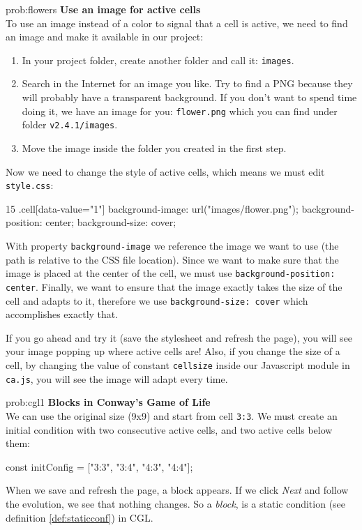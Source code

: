\begin{sol}{prob:flowers}
\textbf{Use an image for active cells}\\
To use an image instead of a color to signal that a cell is active, we need to find an image and
make it available in our project:
\begin{enumerate}
  \item In your project folder, create another folder and call it: \texttt{images}.
  \item Search in the Internet for an image you like. Try to find a PNG because they will probably have
    a transparent background. If you don't want to spend time doing it, we have an image for you:
    \texttt{flower.png} which you can find under folder \texttt{v2.4.1/images}.
  \item Move the image inside the folder you created in the first step.
\end{enumerate}
Now we need to change the style
of active cells, which means we must edit \texttt{style.css}:
\begin{codeh1}{1}{5}
.cell[data-value="1"] {
  background-image: url("images/flower.png");
  background-position: center;
  background-size: cover;
}
\end{codeh1}
With property \texttt{background-image} we reference the image we want to use (the path is relative to the
CSS file location). Since we want to make sure that the image is placed at the center of the cell, we must use
\texttt{background-position: center}. Finally, we want to ensure that the image exactly takes the size of the
cell and adapts to it, therefore we use \texttt{background-size: cover} which accomplishes exactly that.

If you go ahead and try it (save the stylesheet and refresh the page),
you will see your image popping up where active cells are! Also, if you change the size of a cell,
by changing the value of constant \texttt{cellsize} inside our Javascript module in \texttt{ca.js},
you will see the image will adapt every time.
\end{sol}

\begin{sol}{prob:cgl1}
\textbf{Blocks in Conway's Game of Life}\\
We can use the original size (9x9) and start from cell \texttt{3:3}. We must create
an initial condition with two consecutive active cells, and two active cells below them:
\begin{code}
const initConfig = ["3:3", "3:4", "4:3", "4:4"];
\end{code}
When we save and refresh the page, a block appears. If we click \textit{Next} and follow the
evolution, we see that nothing changes. So a \textit{block}, is a static condition
(see definition \ref{def:staticconf}) in CGL.
\end{sol}

